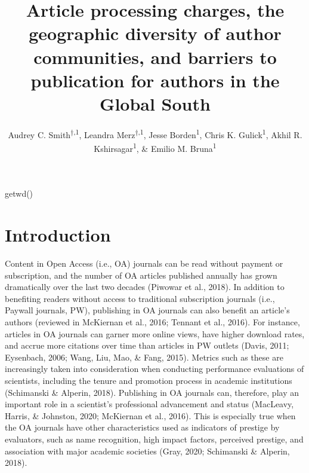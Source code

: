 \documentclass[english,man]{apa6}
\title{Article processing charges, the geographic diversity of author communities, and barriers to publication for authors in the Global South}
\author{Audrey C. Smith\textsuperscript{$\dagger{}$,1}, Leandra Merz\textsuperscript{$\dagger{}$,1}, Jesse Borden\textsuperscript{1}, Chris K. Gulick\textsuperscript{1}, Akhil R. Kshirsagar\textsuperscript{1}, \& Emilio M. Bruna\textsuperscript{1}}
\date{}
\affiliation{\vspace{0.5cm}\textsuperscript{1} University of Florida}
\begin{document}
\maketitle

getwd()

\hypertarget{introduction}{%
\section{Introduction}\label{introduction}}

Content in Open Access (i.e., OA) journals can be read without payment or subscription, and the number of OA articles published annually has grown dramatically over the last two decades (Piwowar et al., 2018). In addition to benefiting readers without access to traditional subscription journals (i.e., Paywall journals, PW), publishing in OA journals can also benefit an article's authors (reviewed in McKiernan et al., 2016; Tennant et al., 2016). For instance, articles in OA journals can garner more online views, have higher download rates, and accrue more citations over time than articles in PW outlets (Davis, 2011; Eysenbach, 2006; Wang, Liu, Mao, \& Fang, 2015). Metrics such as these are increasingly taken into consideration when conducting performance evaluations of scientists, including the tenure and promotion process in academic institutions (Schimanski \& Alperin, 2018). Publishing in OA journals can, therefore, play an important role in a scientist's professional advancement and status (MacLeavy, Harris, \& Johnston, 2020; McKiernan et al., 2016). This is especially true when the OA journals have other characteristics used as indicators of prestige by evaluators, such as name recognition, high impact factors, perceived prestige, and association with major academic societies (Gray, 2020; Schimanski \& Alperin, 2018).\\
\end{document}
